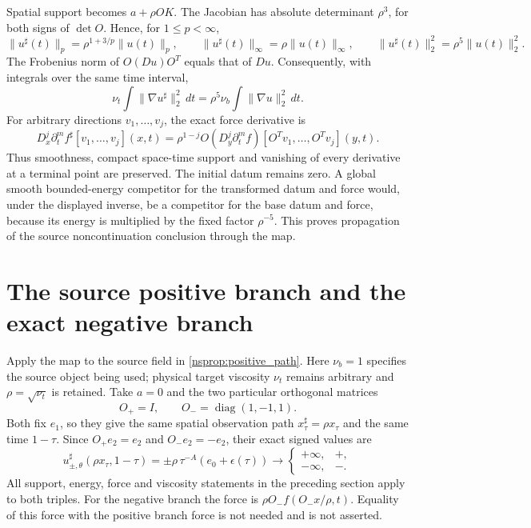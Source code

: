 Spatial support becomes $a+\rho OK$. The Jacobian has absolute
determinant $\rho^3$, for both signs of $\det O$. Hence, for
$1\le p<\infty$,
\begin{equation}
 \|u^\sharp(t)\|_p=\rho^{1+3/p}\|u(t)\|_p,\qquad
 \|u^\sharp(t)\|_\infty=\rho\|u(t)\|_\infty,\qquad
 \|u^\sharp(t)\|_2^2=\rho^5\|u(t)\|_2^2 .
 \label{nsprop:norms}
\end{equation}
The Frobenius norm of $O(Du)O^T$ equals that of $Du$. Consequently,
with integrals over the same time interval,
\[
 \nu_t\int\|\nabla u^\sharp\|_2^2\,dt
     =\rho^5\nu_b\int\|\nabla u\|_2^2\,dt .
\]
For arbitrary directions $v_1,\ldots,v_j$, the exact force derivative is
\[
 D_x^j\partial_t^m f^\sharp[v_1,\ldots,v_j](x,t)
 =\rho^{1-j}O
   (D_y^j\partial_t^m f)[O^Tv_1,\ldots,O^Tv_j](y,t).
\]
Thus smoothness, compact space-time support and vanishing of every
derivative at a terminal point are preserved. The initial datum remains
zero. A global smooth bounded-energy competitor for the transformed
datum and force would, under the displayed inverse, be a competitor
for the base datum and force, because its energy is multiplied by the
fixed factor $\rho^{-5}$. This proves propagation of the source
noncontinuation conclusion through the map.

\section{The source positive branch and the exact negative branch}
\label{nsprop:branches}
Apply the map to the source field in \eqref{nsprop:positive_path}.
Here $\nu_b=1$ specifies the source object being used; physical target
viscosity $\nu_t$ remains arbitrary and $\rho=\sqrt{\nu_t}$ is retained.
Take $a=0$ and the two particular orthogonal matrices
\[
 O_+=I,\qquad O_-=\operatorname{diag}(1,-1,1).
\]
Both fix $e_1$, so they give the same spatial observation path
$x^\sharp_\tau=\rho x_\tau$ and the same time $1-\tau$.
Since $O_+e_2=e_2$ and $O_-e_2=-e_2$, their exact signed values are
\begin{equation}
 u^\sharp_{\pm,\theta}(\rho x_\tau,1-\tau)
     =\pm\rho\,\tau^{-A}(e_0+\epsilon(\tau))
        \longrightarrow\begin{cases}+\infty,&+,\\-\infty,&-.\end{cases}
 \label{nsprop:two_paths}
\end{equation}
All support, energy, force and viscosity statements in the preceding
section apply to both triples. For the negative branch the force is
$\rho O_-f(O_-x/\rho,t)$. Equality of this force with the positive
branch force is not needed and is not asserted.

